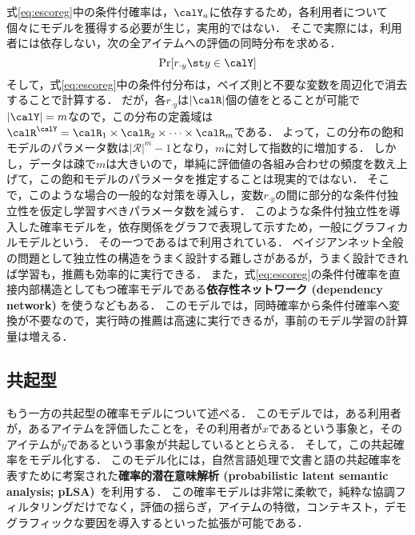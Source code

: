 式\eqref{eq:escoreg}中の条件付確率は，$\calY_a$に依存するため，各利用者について個々にモデルを獲得する必要が生じ，実用的ではない．
そこで実際には，利用者には依存しない，次の全アイテムへの評価の同時分布を求める．
\begin{equation}
\Pr[r_{\cdot y}\st y\in \calY]
\label{eq:jprob}
\end{equation}
そして，式\eqref{eq:escoreg}中の条件付分布は，ベイズ則と不要な変数を周辺化で消去することで計算する．
だが，各$r_{\cdot y}$は$|\calR|$個の値をとることが可能で$|\calY|=m$なので，この分布の定義域は$\calR^{\calY}=\calR_{1}\times\calR_{2}\times\cdots\times\calR_{m}$である．
よって，この分布の飽和モデルのパラメータ数は$|\mathcal{R}|^m-1$となり，$m$に対して指数的に増加する．
しかし，データは疎で$m$は大きいので，単純に評価値の各組み合わせの頻度を数え上げて，この飽和モデルのパラメータを推定することは現実的ではない．
そこで，このような場合の一般的な対策を導入し，変数$r_{\cdot y}$の間に部分的な条件付独立性を仮定し学習すべきパラメータ数を減らす．
このような条件付独立性を導入した確率モデルを，依存関係をグラフで表現して示すため，一般にグラフィカルモデルという．
その一つである\cite{jb:037:00}は\cite{uai:98:01}で利用されている．
ベイジアンネット全般の問題として独立性の構造をうまく設計する難しさがあるが，うまく設計できれば学習も，推薦も効率的に実行できる．
また，式\eqref{eq:escoreg}の条件付確率を直接内部構造としてもつ確率モデルである\textbf{依存性ネットワーク (dependency network) }を使う\cite{jmlr:00:01}などもある．
このモデルでは，同時確率から条件付確率へ変換が不要なので，実行時の推薦は高速に実行できるが，事前のモデル学習の計算量は増える．

\subsection{共起型}

もう一方の共起型の確率モデルについて述べる．
このモデルでは，ある利用者が，あるアイテムを評価したことを，その利用者が$x$であるという事象と，そのアイテムが$y$であるという事象が共起しているととらえる．
そして，この共起確率をモデル化する．
このモデル化には，自然言語処理で文書と語の共起確率を表すために考案された\textbf{確率的潜在意味解析 (probabilistic latent semantic analysis; pLSA)}~\cite{uai:99:01}を利用する．
この確率モデルは非常に柔軟で，純粋な協調フィルタリングだけでなく，評価の揺らぎ，アイテムの特徴，コンテキスト，デモグラフィックな要因を導入するといった拡張が可能である．

